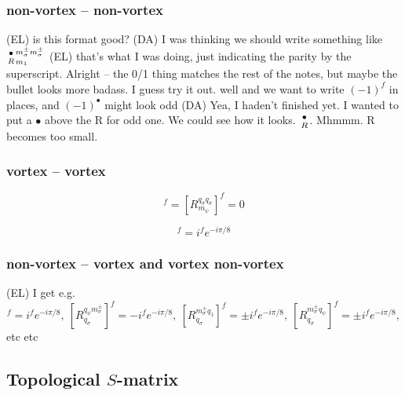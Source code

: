 \documentclass[12pt,a4paper]{article}
\newcommand{\unit}{\mathbf{1}}
\newcommand\be            {\begin{equation}}
\newcommand\ee            {\end{equation}}
\newcommand{\dave}[1]{{\color{ao(english)}\footnotesize{(DA) #1}}}
\newcommand{\ethan}[1]{{\color{amethyst}\footnotesize{(EL) #1}}}
\begin{document}
\subsubsection{non-vortex -- non-vortex}
\ethan{is this format good?}
\dave{I was thinking we should write something like ${\bullet \atop R}^{m_\sigma^\pm m_\sigma^{\pm}}_{m_1}$} \ethan{that's what I was doing, just indicating the parity by the superscript. Alright -- the 0/1 thing matches the rest of the notes, but maybe the bullet looks more badass. I guess try it out. well and we want to write $(-1)^f$ in places, and $(-1)^{\bullet}$ might look odd}
\dave{Yea, I haden't finished yet. I wanted to put a $\bullet$ above the R for odd one. We could see how it looks. ${\bullet \atop R}$. Mhmmm. R becomes too small. }

\subsubsection{vortex -- vortex}
\be [R^{q_\sigma q_\sigma}_{m_1}]^f = [R^{q_\sigma q_\sigma}_{m_\psi}]^f = 0\ee

\be [R^{q_1 q_\psi}_{m_\psi}]^f = i^fe^{-i\pi /8} \ee

\subsubsection{non-vortex -- vortex and vortex non-vortex}

\ethan{I get e.g.
\be [R^{q_1m^\pm_\sigma}_{q_\sigma}]^f = i^fe^{-i\pi/8},\ [R^{q_\psi m^\pm_\sigma}_{q_\sigma}]^f = -i^fe^{-i\pi/8},\ 
[R^{m^\pm_\sigma q_1}_{q_\sigma}]^f = \pm i^fe^{-i\pi/8},\ [R^{m^\pm_\sigma q_\psi}_{q_\sigma}]^f = \pm i^fe^{-i\pi/8},\ee
etc etc}


\subsection{Topological $S$-matrix}
\end{document}
